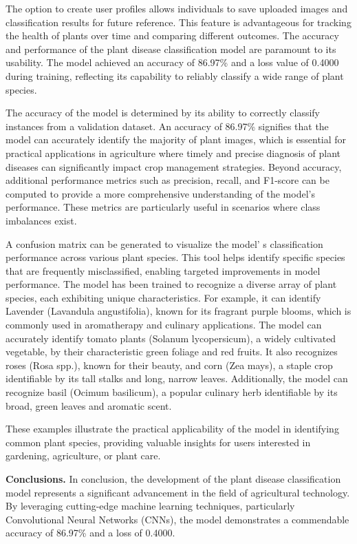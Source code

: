 \begin{multicols}{2}
The option to create user profiles allows individuals to save uploaded
images and classification results for future reference. This feature is
advantageous for tracking the health of plants over time and comparing
different outcomes. The accuracy and performance of the plant disease
classification model are paramount to its usability. The model achieved
an accuracy of 86.97\% and a loss value of 0.4000 during training,
reflecting its capability to reliably classify a wide range of plant
species.

The accuracy of the model is determined by its ability to correctly
classify instances from a validation dataset. An accuracy of 86.97\%
signifies that the model can accurately identify the majority of plant
images, which is essential for practical applications in agriculture
where timely and precise diagnosis of plant diseases can significantly
impact crop management strategies. Beyond accuracy, additional
performance metrics such as precision, recall, and F1-score can be
computed to provide a more comprehensive understanding of the model's
performance. These metrics are particularly useful in scenarios where
class imbalances exist.

A confusion matrix can be generated to visualize the
model' s classification performance across various plant
species. This tool helps identify specific species that are frequently
misclassified, enabling targeted improvements in model performance. The
model has been trained to recognize a diverse array of plant species,
each exhibiting unique characteristics. For example, it can identify
Lavender (Lavandula angustifolia), known for its fragrant purple blooms,
which is commonly used in aromatherapy and culinary applications. The
model can accurately identify tomato plants (Solanum lycopersicum), a
widely cultivated vegetable, by their characteristic green foliage and
red fruits. It also recognizes roses (Rosa spp.), known for their
beauty, and corn (Zea mays), a staple crop identifiable by its tall
stalks and long, narrow leaves. Additionally, the model can recognize
basil (Ocimum basilicum), a popular culinary herb identifiable by its
broad, green leaves and aromatic scent.

These examples illustrate the practical applicability of the model in
identifying common plant species, providing valuable insights for users
interested in gardening, agriculture, or plant care.

{\bfseries Conclusions.} In conclusion, the development of the plant
disease classification model represents a significant advancement in the
field of agricultural technology. By leveraging cutting-edge machine
learning techniques, particularly Convolutional Neural Networks (CNNs),
the model demonstrates a commendable accuracy of 86.97\% and a loss of
0.4000.


\end{multicols}
